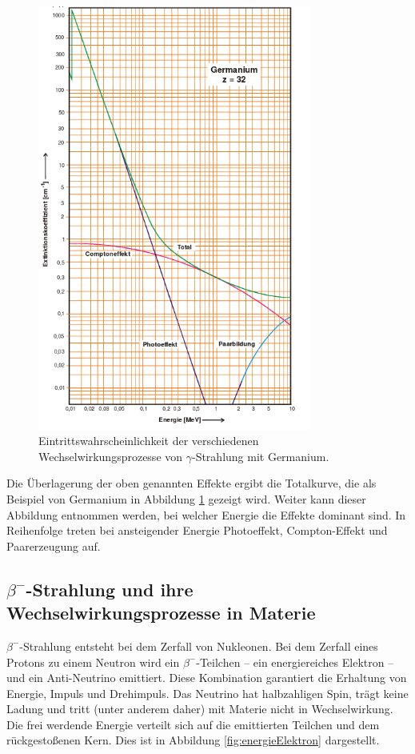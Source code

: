\begin{figure}
	\centering
	\includegraphics[width=0.8\textwidth]{Bilder/germanium.png}
	\caption{Eintrittswahrscheinlichkeit der verschiedenen Wechselwirkungsprozesse von \texorpdfstring{$\gamma$}{Gamma}-Strahlung mit Germanium.\cite{skript}}
	\label{fig:Germanium}
\end{figure}
Die Überlagerung der oben genannten Effekte ergibt die Totalkurve, die als Beispiel von Germanium in Abbildung \ref{fig:Germanium} gezeigt wird.
Weiter kann dieser Abbildung entnommen werden, bei welcher Energie die Effekte dominant sind.
In Reihenfolge treten bei ansteigender Energie Photoeffekt, Compton-Effekt und Paarerzeugung auf.


\subsection{\texorpdfstring{$\beta^-$}{Beta}-Strahlung und ihre Wechselwirkungsprozesse in Materie}
\label{sec:beta}

$\beta^-$-Strahlung entsteht bei dem Zerfall von Nukleonen.
Bei dem Zerfall eines Protons zu einem Neutron wird ein $\beta^-$-Teilchen -- ein energiereiches Elektron -- und ein Anti-Neutrino emittiert.
Diese Kombination garantiert die Erhaltung von Energie, Impuls und Drehimpuls.
Das Neutrino hat halbzahligen Spin, trägt keine Ladung und tritt (unter anderem daher) mit Materie nicht in Wechselwirkung.
Die frei werdende Energie verteilt sich auf die emittierten Teilchen und dem rückgestoßenen Kern.
Dies ist in Abbildung \ref{fig:energieElektron} dargestellt.

